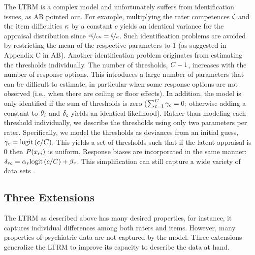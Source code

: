 \documentclass[a4paper]{article}
\newcommand{\AB}{AB}
\begin{document}
The LTRM is a complex model and unfortunately suffers from identification issues, as \AB{} pointed out. For example, multiplying the rater competences $\zeta$ and the item difficulties $\kappa$ by a constant $c$ yields an identical variance for the appraisal distribution since $\nicefrac{c\zeta}{c\kappa} = \nicefrac{\zeta}{\kappa}$. Such identification problems are avoided by restricting the mean of the respective parameters to 1 (as suggested in Appendix C in \AB{}).
Another identification problem originates from estimating the thresholds individually. The number of thresholds, $\Tncat-1$, increases with the number of response options. This introduces a large number of parameters that can be difficult to estimate, in particular when some response options are not observed (i.e., when there are ceiling or floor effects). In addition, the model is only identified if the sum of thresholds is zero ($\sum_{\Incat=1}^{\Tncat}\UnBiasedThreshold_\Incat = 0$; otherwise adding a constant to $\theta{}_i$ and $\delta_c$ yields an identical likelihood). Rather than modeling each threshold individually, we describe the thresholds using only two parameters per rater. Specifically, we model the thresholds as deviances from an initial guess, $\gamma_c = \text{logit}\left(c/C\right)$. This yields a set of thresholds such that if the latent appraisal is 0 then $P(x_{ri})$ is uniform. Response biases are incorporated in the same manner: $\delta_{rc} = \alpha_r\text{logit}\left(c/C\right) + \beta_r$. This simplification can still capture a wide variety of data sets \cite{Selker2019}. 

\subsection*{Three Extensions}

The LTRM as described above has many desired properties, for instance, it captures individual differences among both raters and items. However, many properties of psychiatric data are not captured by the model. Three extensions generalize the LTRM to improve its capacity to describe the data at hand.
\end{document}
